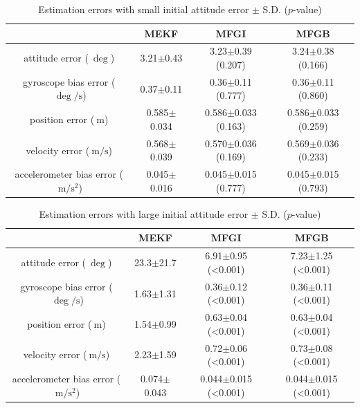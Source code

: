 \begin{table}
	\centering
	\caption{Estimation errors with small initial attitude error $\pm$ S.D. ($p$-value)}
	\label{tab:posEst-error-1}
	\small
	\begin{tabular}{c|ccc}
		\hline\hline
		 & MEKF & MFGI & MFGB \\ \hline
		attitude error ($\SI{}{\deg}$) & 3.21$\pm$0.43 & 3.23$\pm$0.39 (0.207) & 3.24$\pm$0.38 (0.166) \\ \hline
		gyroscope bias error ($\SI{}{\deg/\second}$) & 0.37$\pm$0.11 & 0.36$\pm$0.11 (0.777) & 0.36$\pm$0.11 (0.860) \\ \hline
		position error ($\SI{}{\meter}$) & 0.585$\pm$0.034 & 0.586$\pm$0.033 (0.163) & 0.586$\pm$0.033 (0.259) \\ \hline
		velocity error ($\SI{}{\meter/\second}$) & 0.568$\pm$0.039 & 0.570$\pm$0.036 (0.169) & 0.569$\pm$0.036 (0.233) \\ \hline
		accelerometer bias error ($\SI{}{\meter/\second\squared}$) & 0.045$\pm$0.016 & 0.045$\pm$0.015 (0.777) & 0.045$\pm$0.015 (0.793) \\ \hline\hline
	\end{tabular}
\end{table}

\begin{table}
	\centering
	\caption{Estimation errors with large initial attitude error $\pm$ S.D. ($p$-value)}
	\label{tab:posEst-error-2}
	\small
	\begin{tabular}{c|ccc}
		\hline\hline
		& MEKF & MFGI & MFGB \\ \hline
		attitude error ($\SI{}{\deg}$) & 23.3$\pm$21.7 & 6.91$\pm$0.95 (<0.001) & 7.23$\pm$1.25 (<0.001) \\ \hline
		gyroscope bias error ($\SI{}{\deg/\second}$) & 1.63$\pm$1.31 & 0.36$\pm$0.12 (<0.001) & 0.36$\pm$0.11 (<0.001) \\ \hline
		position error ($\SI{}{\meter}$) & 1.54$\pm$0.99 & 0.63$\pm$0.04 (<0.001) & 0.63$\pm$0.04 (<0.001) \\ \hline
		velocity error ($\SI{}{\meter/\second}$) & 2.23$\pm$1.59 & 0.72$\pm$0.06 (<0.001) & 0.73$\pm$0.08 (<0.001) \\ \hline
		accelerometer bias error ($\SI{}{\meter/\second\squared}$) & 0.074$\pm$0.043 & 0.044$\pm$0.015 (<0.001) & 0.044$\pm$0.015 (<0.001) \\ \hline\hline
	\end{tabular}
\end{table}

